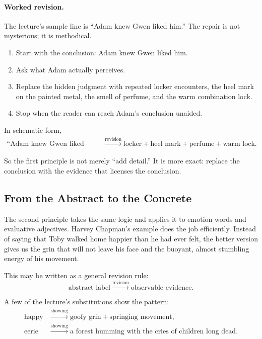 \paragraph{Worked revision.} The lecture's sample line is ``Adam knew Gwen liked him.'' The repair is not mysterious; it is methodical.
\begin{enumerate}
\item Start with the conclusion: Adam knew Gwen liked him.
\item Ask what Adam actually perceives.
\item Replace the hidden judgment with repeated locker encounters, the heel mark on the painted metal, the smell of perfume, and the warm combination lock.
\item Stop when the reader can reach Adam's conclusion unaided.
\end{enumerate}

In schematic form,
\begin{align}
\text{``Adam knew Gwen liked him''}
&\xrightarrow{\text{revision}}
\text{locker} + \text{heel mark} + \text{perfume} + \text{warm lock}.
\end{align}

So the first principle is not merely ``add detail.'' It is more exact: replace the conclusion with the evidence that licenses the conclusion.

\subsection{From the Abstract to the Concrete}

The second principle takes the same logic and applies it to emotion words and evaluative adjectives. Harvey Chapman's example does the job efficiently. Instead of saying that Toby walked home happier than he had ever felt, the better version gives us the grin that will not leave his face and the buoyant, almost stumbling energy of his movement.

This may be written as a general revision rule:
\begin{equation}
\text{abstract label} \xrightarrow{\text{revision}} \text{observable evidence}.
\end{equation}

A few of the lecture's substitutions show the pattern:
\begin{align}
\text{happy}
&\xrightarrow{\text{showing}}
\text{goofy grin} + \text{springing movement},\\
\text{eerie}
&\xrightarrow{\text{showing}}
\text{a forest humming with the cries of children long dead}.
\end{align}

